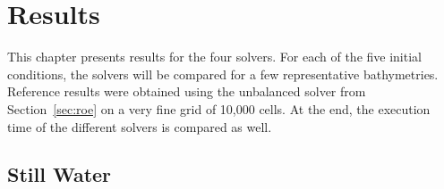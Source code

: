 \chapter{Results}
\label{ch:results}

This chapter presents results for the four solvers. For each of the five initial conditions, the solvers will be compared for a few representative bathymetries. Reference results were obtained using the unbalanced solver from Section~\ref{sec:roe} on a very fine grid of 10,000 cells. At the end, the execution time of the different solvers is compared as well.

\section{Still Water}



